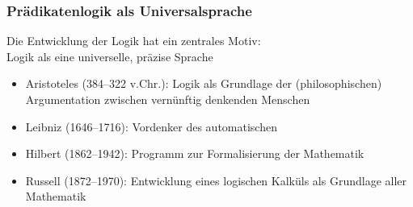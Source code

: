\documentclass[onlymath]{beamer}
\begin{document}
\begin{frame}\label{frame_logiker}\frametitle{Prädikatenlogik als Universalsprache}

Die Entwicklung der Logik hat ein zentrales Motiv:\\
\alert{Logik als eine universelle, präzise Sprache}\pause

\begin{itemize}
\item {}%
	Aristoteles (384--322 v.Chr.): Logik als Grundlage der (philosophischen) Argumentation zwischen vernünftig denkenden Menschen\pause
\item {}%
	Leibniz (1646--1716): Vordenker des automatischen \\
\pause
\item {}%
	Hilbert (1862--1942): Programm zur Formalisierung der Mathematik\pause
\item {}%
	Russell (1872--1970): Entwicklung eines logischen Kalküls als Grundlage aller Mathematik
\end{itemize}

\end{frame}
\end{document}
